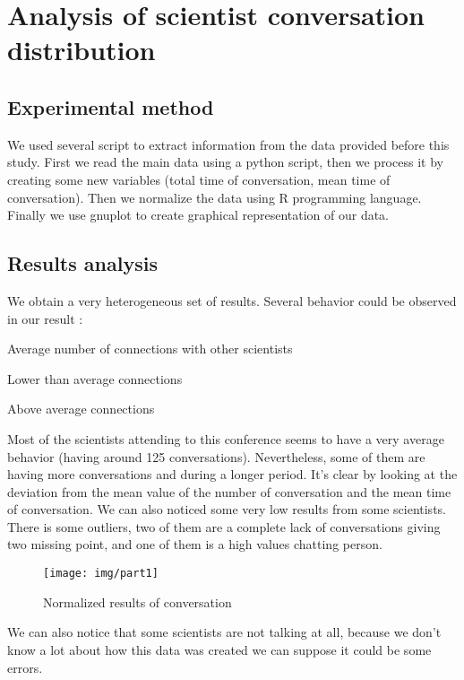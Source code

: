 \section{Analysis of scientist conversation distribution}

\subsection{Experimental method}

We used several script to extract information from the data provided before this study.
First we read the main data using a python script, then we process it by creating some 
new variables (total time of conversation, mean time of conversation). Then we normalize
the data using R programming language. Finally we use gnuplot to create graphical representation
of our data.

\subsection{Results analysis}

We obtain a very heterogeneous set of results. Several behavior could be observed in our result :
\begin{description}
\item Average number of connections with other scientists
\item Lower than average connections
\item Above average connections
\end{description}

Most of the scientists attending to this conference seems to have a very average behavior
(having around 125 conversations). Nevertheless, some of them are having more conversations
and during a longer period. It's clear by looking at the deviation from the mean value of the 
number of conversation and the mean time of conversation. We can also noticed some very low
results from some scientists. There is some outliers, two of them are a complete lack of conversations
giving two missing point, and one of them is a high values chatting person.

\begin{figure}[h]
\begin{center}
\texttt{[image: img/part1]}
\end{center}
\caption{Normalized results of conversation}
\end{figure}

We can also notice that some scientists are not talking at all, because we don't know 
a lot about how this data was created we can suppose it could be some errors.

